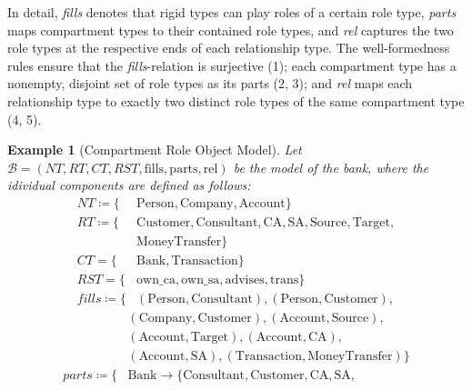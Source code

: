 \documentclass[english,ngerman,BCOR=6mm,cdgeometry=no,DIV=13,twoside,cdmath=false]{tudscrreprt}
\newtheorem{example}{Example} \usepackage{blindtext}
\begin{document}
\noindent
In detail, \emph{fills} denotes that rigid types can play roles of a
certain role type, \emph{parts} maps compartment types to their
contained role types, and \emph{rel} captures the two role types at the
respective ends of each relationship type. The well-formedness rules
ensure that the \emph{fills}-relation is surjective (1); each
compartment type has a nonempty, disjoint set of role types as its parts
(2, 3); and \emph{rel} maps each relationship type to exactly two
distinct role types of the same compartment type (4, 5).

\begin{example}[Compartment Role Object Model]
Let $\mathcal{B} = (NT, RT, CT, RST,\text{fills}, \text{parts}, \text{rel})$ be the model of the bank,
where the idividual components are defined as follows:
\begin{align*}
NT \coloneqq \{ &\text{Person}, \text{Company}, \text{Account} \}\\
RT \coloneqq \{ &\text{Customer}, \text{Consultant},\text{CA},\text{SA},\text{Source},\text{Target},\\
                &\text{MoneyTransfer} \}\\
CT = \{ &\text{Bank}, \text{Transaction} \}\\
RST = \{ &\text{own\_ca}, \text{own\_sa}, \text{advises}, \text{trans} \}\\
\mathit{fills} \coloneqq \{ &(\text{Person}, \text{Consultant}), (\text{Person}, \text{Customer}),%
\end{align*}
\begin{align*}
            & (\text{Company}, \text{Customer}), (\text{Account}, \text{Source}),\\
            & (\text{Account}, \text{Target}), (\text{Account}, \text{CA}),\\
            & (\text{Account}, \text{SA}), (\text{Transaction}, \text{MoneyTransfer}) \}\\
 \mathit{parts} \coloneqq \{ & \text{Bank} \rightarrow \{\text{Consultant},\text{Customer},\text{CA},\text{SA},\\

\end{align*}
\end{example}
\end{document}
